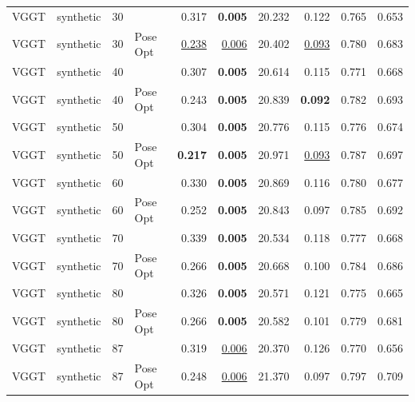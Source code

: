 \begin{table}[H]
\begin{tabular}{llrlrrrrrr}
VGGT & synthetic & 30 &  & 0.317 & \textbf{0.005} & 20.232 & 0.122 & 0.765 & 0.653 \\
VGGT & synthetic & 30 & Pose Opt & \underline{0.238} & \underline{0.006} & 20.402 & \underline{0.093} & 0.780 & 0.683 \\
VGGT & synthetic & 40 &  & 0.307 & \textbf{0.005} & 20.614 & 0.115 & 0.771 & 0.668 \\
VGGT & synthetic & 40 & Pose Opt & 0.243 & \textbf{0.005} & 20.839 & \textbf{0.092} & 0.782 & 0.693 \\
VGGT & synthetic & 50 &  & 0.304 & \textbf{0.005} & 20.776 & 0.115 & 0.776 & 0.674 \\
VGGT & synthetic & 50 & Pose Opt & \textbf{0.217} & \textbf{0.005} & 20.971 & \underline{0.093} & 0.787 & 0.697 \\
VGGT & synthetic & 60 &  & 0.330 & \textbf{0.005} & 20.869 & 0.116 & 0.780 & 0.677 \\
VGGT & synthetic & 60 & Pose Opt & 0.252 & \textbf{0.005} & 20.843 & 0.097 & 0.785 & 0.692 \\
VGGT & synthetic & 70 &  & 0.339 & \textbf{0.005} & 20.534 & 0.118 & 0.777 & 0.668 \\
VGGT & synthetic & 70 & Pose Opt & 0.266 & \textbf{0.005} & 20.668 & 0.100 & 0.784 & 0.686 \\
VGGT & synthetic & 80 &  & 0.326 & \textbf{0.005} & 20.571 & 0.121 & 0.775 & 0.665 \\
VGGT & synthetic & 80 & Pose Opt & 0.266 & \textbf{0.005} & 20.582 & 0.101 & 0.779 & 0.681 \\
VGGT & synthetic & 87 &  & 0.319 & \underline{0.006} & 20.370 & 0.126 & 0.770 & 0.656 \\
VGGT & synthetic & 87 & Pose Opt & 0.248 & \underline{0.006} & 21.370 & 0.097 & 0.797 & 0.709 \\
\bottomrule
\end{tabular}
\end{table}